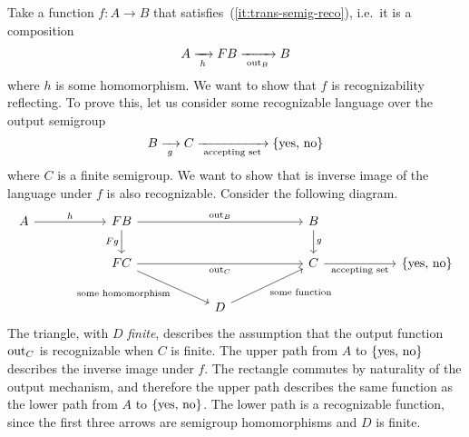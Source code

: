  Take a function $f : A \to B$ that satisfies~(\ref{it:trans-semig-reco}), i.e.~it is a composition 
\begin{align*}
    A \xrightarrow[\;h\;]{} \functor B \xrightarrow[\;\outfun_B\;]{} B
\end{align*}
where $h$ is some homomorphism.
We want to show that $f$ is recognizability reflecting. To prove this, let us consider some recognizable language over the output semigroup 
\begin{align*}
    B \xrightarrow[\;g\;]{} C \xrightarrow[\;\text{accepting set}\;]{} \{\text{yes, no}\}
\end{align*}
where $C$ is a finite semigroup.
We want to show that is inverse image of the language under $f$ is also recognizable. Consider the following diagram. 
\[\begin{tikzcd}
    [column sep=2cm]
	A & {\functor B} & & B \\
	& {\functor C} & & C & \set{\text{yes, no}}\\
    & & D
	\arrow["h", from=1-1, to=1-2]
	\arrow["\outfun_B", from=1-2, to=1-4]
	\arrow["{\functor g}"', from=1-2, to=2-2]
	\arrow["\outfun_C"', from=2-2, to=2-4]
	\arrow["g", from=1-4, to=2-4]
	\arrow["\text{accepting set}"', from=2-4, to=2-5]
    \arrow["\text{some homomorphism}"', from=2-2, to=3-3]
    \arrow["\text{some function}"', from=3-3, to=2-4]
\end{tikzcd}\]
The triangle, with $D$ \emph{finite}, describes  the assumption that the output function $\mathrm{out}_C$ is recognizable when $C$ is finite.
The upper path from $A$ to $\{\text{yes, no}\}$ describes the inverse image under $f$. 
 The  rectangle commutes by naturality of the output mechanism, and therefore the upper path describes the same function as the lower path from $A$ to $\{\text{yes, no}\}$. The lower path is a recognizable function, since the first three arrows are semigroup homomorphisms and $D$ is finite.
